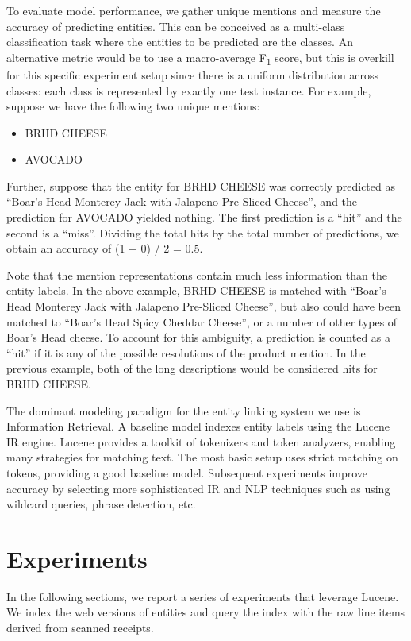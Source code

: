 \documentclass[11pt,a4paper]{article}
\newenvironment{myitemize}
{ \begin{itemize}
    \setlength{\itemsep}{0pt}
    \setlength{\parskip}{0pt}
    \setlength{\parsep}{0pt}     }
{ \end{itemize}                  }
\begin{document}
To evaluate model performance, we gather unique mentions and
measure the accuracy of predicting entities.  This can be conceived as
a multi-class classification task where the entities to be predicted
are the classes.  An alternative metric would be to use a
macro-average F\textsubscript{1} score, but this is overkill for this specific
experiment setup since there is a uniform distribution across classes:
each class is represented by exactly one test instance. 
For example, suppose we have the following two
unique mentions: 
\begin{myitemize}
\item BRHD CHEESE
\item AVOCADO
\end{myitemize}
Further, suppose that the entity for BRHD CHEESE was correctly
predicted as “Boar's Head Monterey Jack with Jalapeno Pre-Sliced
Cheese”, and the prediction for AVOCADO yielded nothing.  The first
prediction is a ``hit'' and the second is a ``miss''.  Dividing the
total hits by the total number of predictions, we obtain an accuracy
of (1 + 0) / 2 = 0.5. 

Note that the mention representations contain
much less information than the entity labels.  In the above example,
BRHD CHEESE is matched with  ``Boar's Head Monterey Jack with Jalapeno
Pre-Sliced Cheese'', but also could have been matched to  ``Boar's
Head Spicy Cheddar Cheese'', or a number of other types of Boar's Head
cheese.  To account for this ambiguity, a prediction is counted as a
“hit” if it is any of the possible resolutions of the product mention.
In the previous example, both of the long descriptions would be
considered hits for BRHD CHEESE. 

The dominant modeling paradigm for the entity linking system we use is
Information Retrieval.   A baseline model indexes entity labels using the Lucene
~\cite{lucene} IR
engine.  Lucene provides a toolkit of tokenizers and token analyzers,
enabling many strategies for matching text.  The most basic setup uses
strict matching on tokens, providing a good baseline model.
Subsequent experiments improve accuracy by selecting more
sophisticated IR and NLP techniques such as using wildcard
queries, phrase detection, etc.

\section{Experiments}

In the following sections, we report a series of experiments that
leverage Lucene.  We index the web versions of entities and query the
index with the raw line items derived from scanned receipts.
\end{document}

